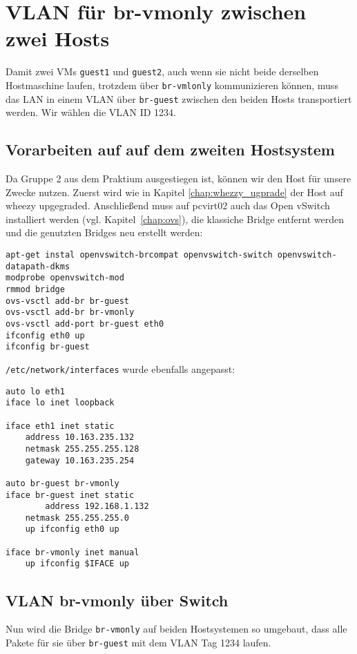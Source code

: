 \chapter{VLAN für br-vmonly zwischen zwei Hosts}
\label{vlan_trunk}
Damit zwei VMs \verb#guest1# und \verb#guest2#, auch wenn sie nicht beide derselben Hostmaschine laufen, trotzdem über \verb#br-vmlonly# kommunizieren können, muss das LAN in einem VLAN über \verb#br-guest# zwischen den beiden Hosts transportiert werden. Wir wählen die VLAN ID 1234.

\section {Vorarbeiten auf auf dem zweiten Hostsystem}\label{ovs2}
Da Gruppe 2 aus dem Praktium ausgestiegen ist, können wir den Host für unsere Zwecke nutzen. Zuerst wird wie in Kapitel \ref{chap:whezzy_ugprade} der Host auf wheezy upgegraded.
Anschließend muss auf pcvirt02 auch das Open vSwitch installiert werden (vgl. Kapitel~\ref{chap:ovs}), die klassiche Bridge entfernt werden und die genutzten Bridges neu erstellt werden:
\begin{verbatim}
apt-get instal openvswitch-brcompat openvswitch-switch openvswitch-datapath-dkms
modprobe openvswitch-mod
rmmod bridge
ovs-vsctl add-br br-guest
ovs-vsctl add-br br-vmonly
ovs-vsctl add-port br-guest eth0
ifconfig eth0 up
ifconfig br-guest
\end{verbatim}

\verb#/etc/network/interfaces# wurde ebenfalls angepasst:
\setupVerbatimOut
\begin{verbatim}
auto lo eth1
iface lo inet loopback

iface eth1 inet static
    address 10.163.235.132
	netmask 255.255.255.128
	gateway 10.163.235.254

auto br-guest br-vmonly
iface br-guest inet static
        address 192.168.1.132
	netmask 255.255.255.0
	up ifconfig eth0 up

iface br-vmonly inet manual 
	up ifconfig $IFACE up 
\end{verbatim}

\section{VLAN br-vmonly über Switch}
Nun wird die Bridge \verb#br-vmonly# auf beiden Hostsystemen so umgebaut, dass alle Pakete für sie über \verb#br-guest# mit dem VLAN Tag 1234 laufen.

